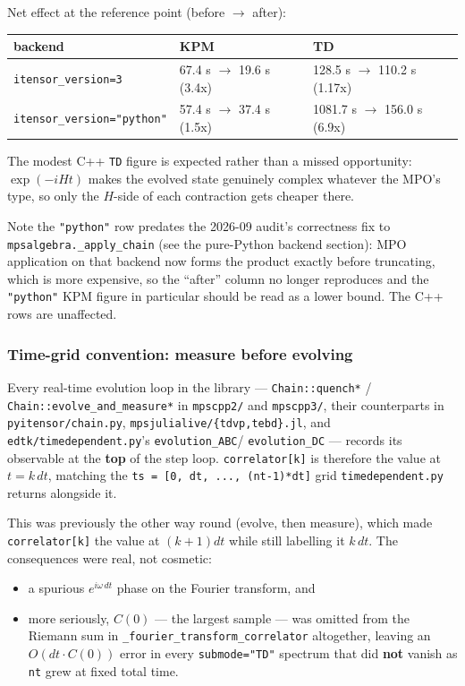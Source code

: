 \documentclass[11pt]{article}
\begin{document}
Net effect at the reference point (before $\to$ after):

\begin{center}
\begin{tabular}{lll}
\hline
backend & KPM & TD \\
\hline
\texttt{itensor\_version=3} & 67.4 s $\to$ 19.6 s (3.4x) & 128.5 s $\to$ 110.2 s (1.17x) \\
\texttt{itensor\_version="python"} & 57.4 s $\to$ 37.4 s (1.5x) & 1081.7 s $\to$ 156.0 s (6.9x) \\
\hline
\end{tabular}
\end{center}

The modest C++ \texttt{TD} figure is expected rather than a missed
opportunity: $\exp(-iHt)$ makes the evolved state genuinely complex
whatever the MPO's type, so only the $H$-side of each contraction gets
cheaper there.

Note the \texttt{"python"} row predates the 2026-09 audit's correctness
fix to \texttt{mpsalgebra.\_apply\_chain} (see the pure-Python backend
section): MPO application on that backend now forms the product exactly
before truncating, which is more expensive, so the ``after'' column no
longer reproduces and the \texttt{"python"} KPM figure in particular
should be read as a lower bound. The C++ rows are unaffected.

\subsubsection{Time-grid convention: measure before evolving}

Every real-time evolution loop in the library ---
\texttt{Chain::quench*} / \texttt{Chain::evolve\_and\_measure*} in
\texttt{mpscpp2/} and \texttt{mpscpp3/}, their counterparts in
\texttt{pyitensor/chain.py}, \texttt{mpsjulialive/\{tdvp,tebd\}.jl}, and
\texttt{edtk/timedependent.py}'s \texttt{evolution\_ABC}/
\texttt{evolution\_DC} --- records its observable at the \textbf{top} of
the step loop. \texttt{correlator[k]} is therefore the value at
$t=k\,dt$, matching the \texttt{ts = [0, dt, ..., (nt-1)*dt]} grid
\texttt{timedependent.py} returns alongside it.

This was previously the other way round (evolve, then measure), which
made \texttt{correlator[k]} the value at $(k+1)dt$ while still labelling
it $k\,dt$. The consequences were real, not cosmetic:

\begin{itemize}
\item a spurious $e^{i\omega\,dt}$ phase on the Fourier transform, and
\item more seriously, $C(0)$ --- the largest sample --- was omitted from
the Riemann sum in \texttt{\_fourier\_transform\_correlator} altogether,
leaving an $O(dt\cdot C(0))$ error in every \texttt{submode="TD"}
spectrum that did \textbf{not} vanish as \texttt{nt} grew at fixed total
time.
\end{itemize}
\end{document}
